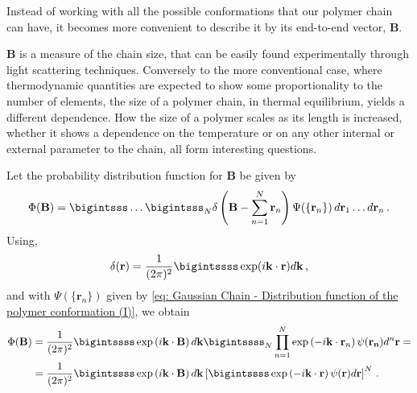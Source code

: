 \documentclass[../../main.tex]{subfiles}
\begin{document}
    Instead of working with all the possible conformations that our polymer chain can have, it becomes more convenient to describe it by its end-to-end vector, $\mathbf{B}$. 
    
    $\mathbf{B}$ is a measure of the chain size, that can be easily found experimentally through light scattering techniques. Conversely to the more conventional case, where thermodynamic quantities are expected to show some proportionality to the number of elements, the size of a polymer chain, in thermal equilibrium, yields a different dependence. How the size of a polymer scales as its length is increased, whether it shows a dependence on the temperature or on any other internal or external parameter to the chain, all form interesting questions. 
    
    Let the probability distribution function for $\mathbf{B}$ be given by
        \begin{equation}\label{eq: Gaussian Chain - PDF of the e2e vector of a chain - I}
            \Phi(\mathbf{B}) = \bigintsss \ldots \bigintsss_N \delta\left( \mathbf{B} - \sum_{n = 1}^N \mathbf{r}_n \right) \Psi(\{\mathbf{r}_n\}) \, d\mathbf{r}_1 \ldots d\mathbf{r}_n \,.
        \end{equation}
    Using,
        \begin{equation}\label{eq: Gaussian Chain - Delta Kronecker}
            \delta (\mathbf{r}) = \frac{1}{(2\pi)^2}\bigintssss \exp(i\mathbf{k}\cdot \mathbf{r}) d\mathbf{k} \,,
        \end{equation}
    and with $\Psi(\{\mathbf{r}_n\})$ given by \cref{eq: Gaussian Chain - Distribution function of the polymer conformation (I)}, we obtain
        \begin{equation}\label{eq: Gaussian Chain - PDF of the e2e vector of a chain - II}
        \begin{split}
            \Phi(\mathbf{B}) &= 
            \frac{1}{(2\pi)^2} \bigintssss \exp\left( i\mathbf{k}\cdot \mathbf{B} \right) d\mathbf{k} \bigintssss_N \prod_{n = 1}^N \exp \left(-i\mathbf{k}\cdot\mathbf{r}_n\right)\psi(\mathbf{r_n}) d^n\mathbf{r} = \\
            &= \frac{1}{(2\pi)^2} \bigintssss \exp\left( i\mathbf{k}\cdot \mathbf{B} \right) d\mathbf{k} \left[\bigintssss \exp\left(- i\mathbf{k}\cdot\mathbf{r} \right)\psi(\mathbf{r}) d\mathbf{r}\right]^N \,.
        \end{split}
        \end{equation}
        
\end{document}
